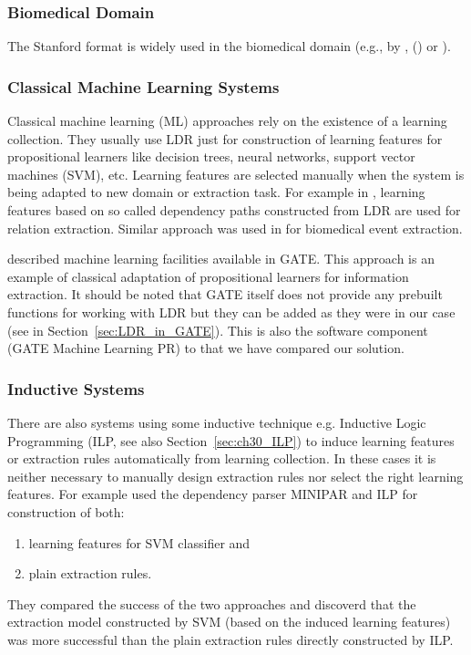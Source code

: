 \subsubsection{Biomedical Domain}

The
Stanford format is widely used in the biomedical
domain (e.g., by \cite{MiyaoACL2008}, (\cite{Yakushiji2001}) or
\cite{Clegg2005Evaluating}).



\subsubsection{Classical Machine Learning Systems}

Classical machine learning (ML) approaches rely on the existence of a learning collection. They usually use LDR just for construction of learning features for propositional learners like decision trees, neural networks, support vector machines (SVM), etc. Learning features are selected manually when the system is being adapted to new domain or extraction task. For example in \citep{Bunescu:DependencyPaths}, learning features based on so called dependency paths constructed from LDR are used for relation extraction. Similar approach was used in \citep{Buyko:dependencyGraphs} for biomedical event extraction.


\citep{Yaoyong09a} described machine learning facilities available in GATE. This approach is an example of classical adaptation of propositional learners for information extraction. It should be noted that GATE itself does not provide any prebuilt functions for working with LDR but they can be added as they were in our case (see in Section~\ref{sec:LDR_in_GATE}). This is also the software component (GATE Machine Learning PR) to that we have compared our solution. 


\subsubsection{Inductive Systems}

There are also systems using some inductive technique e.g. Inductive Logic Programming (ILP, see also Section~\ref{sec:ch30_ILP}) to induce learning features or extraction rules automatically from learning collection. In these cases it is neither necessary to manually design extraction rules nor select the right learning features. For example \cite{DBLP:conf/ilp/RamakrishnanJBS07} used the dependency parser MINIPAR \citep{minipar} and ILP for construction of both:
\begin{enumerate}
	\item learning features for SVM classifier and
	\item plain extraction rules.
\end{enumerate}
They compared the success of the two approaches and discoverd that the extraction model constructed by SVM (based on the induced learning features) was more successful than the plain extraction rules directly constructed by ILP.




